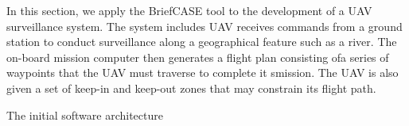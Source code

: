In this section, we apply the BriefCASE tool to the development of a UAV surveillance system.  The system includes  UAV receives commands from a ground station to conduct
surveillance along a geographical feature such as a river. The on-board mission computer then generates a flight plan consisting ofa series of waypoints that the UAV must traverse to complete it smission. The UAV is also given a set of keep-in and keep-out zones that may constrain its flight path.

The initial software architecture